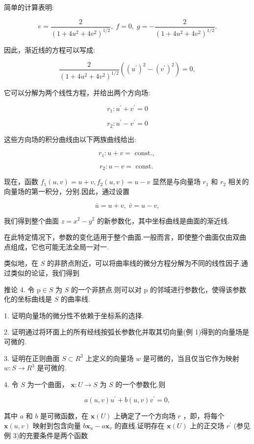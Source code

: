 简单的计算表明:

\[
e = \frac{2}{{\left( 1 + 4{u}^{2} + 4{v}^{2}\right) }^{1/2}},\;f = 0,\;g =  - \frac{2}{{\left( 1 + 4{u}^{2} + 4{v}^{2}\right) }^{1/2}}.
\]

因此，渐近线的方程可以写成:

\[
\frac{2}{{\left( 1 + 4{u}^{2} + 4{v}^{2}\right) }^{1/2}}\left( {{\left( {u}^{\prime }\right) }^{2} - {\left( {v}^{\prime }\right) }^{2}}\right)  = 0,
\]

它可以分解为两个线性方程，并给出两个方向场:

\[
{r}_{1} : {u}^{\prime } + {v}^{\prime } = 0
\]

\[
{r}_{2} : {u}^{\prime } - {v}^{\prime } = 0
\]

这些方向场的积分曲线由以下两族曲线给出:

\[
{r}_{1} : u + v = \text{ const., }
\]

\[
{r}_{2} : u - v = \text{ const. }
\]

现在，函数 \({f}_{1}\left( {u,v}\right)  = u + v,{f}_{2}\left( {u,v}\right)  = u - v\) 显然是与向量场 \({r}_{1}\) 和 \({r}_{2}\) 相关的向量场的第一积分，分别.因此，通过设置

\[
\bar{u} = u + v,\;\bar{v} = u - v,
\]

我们得到整个曲面 \(z = {x}^{2} - {y}^{2}\) 的新参数化，其中坐标曲线是曲面的渐近线.

在此特定情况下，参数的变化适用于整个曲面.一般而言，即使整个曲面仅由双曲点组成，它也可能无法全局一对一.

类似地，在 \(S\) 的非脐点附近，可以将曲率线的微分方程分解为不同的线性因子.通过类似的论证，我们得到

推论 4. 令 \(\mathrm{p} \in  S\) 为 \(S\) 的一个非脐点.则可以对 \(\mathrm{p}\) 的邻域进行参数化，使得该参数化的坐标曲线是 \(S\) 的曲率线.

\exerciseline

1. 证明向量场的微分性不依赖于坐标系的选择.

2. 证明通过将环面上的所有经线按弧长参数化并取其切向量(例 1)得到的向量场是可微的.

3. 证明在正则曲面 \(S \subset  {R}^{3}\) 上定义的向量场 \(w\) 是可微的，当且仅当它作为映射 \(w : S \rightarrow  {R}^{3}\) 是可微的.

4. 令 \(S\) 为一个曲面， \(\mathbf{x} : U \rightarrow  S\) 为 \(S\) 的一个参数化.则

\[
a\left( {u,v}\right) {u}^{\prime } + b\left( {u,v}\right) {v}^{\prime } = 0,
\]

其中 \(a\) 和 \(b\) 是可微函数，在 \(\mathbf{x}\left( U\right)\) 上确定了一个方向场 \(r\) ，即，将每个 \(\mathbf{x}\left( {u,v}\right)\) 映射到包含向量 \(b{\mathbf{x}}_{u} - a{\mathbf{x}}_{v}\) 的直线.证明存在 \(\mathbf{x}\left( U\right)\) 上的正交场 \({r}^{\prime }\) (参见例 3)的充要条件是两个函数


